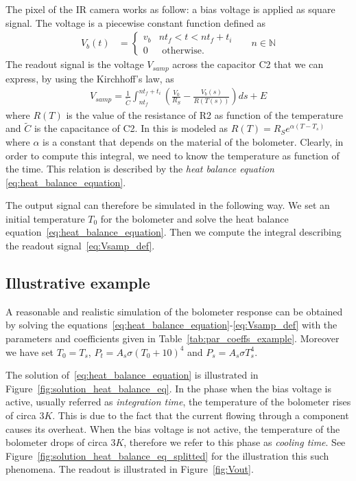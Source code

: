 The pixel of the IR camera works as follow: a bias voltage is applied as square signal. The voltage is a piecewise constant function defined as
\begin{align} \label{eq:Vb}
 V_b(t)&=\begin{cases} v_b & n t_f < t < n t_f + t_i \\
 0 &\mbox{ otherwise.}
 \end{cases} && n \in {\mathbb N}
\end{align}
The readout signal is the voltage $V_{samp}$ across the capacitor C2 that we can express, by using the Kirchhoff's law, as
\begin{align} \label{eq:Vsamp_def}
 V_{samp} =
 \frac{1}{\tilde C} \int_{n t_f}^{n t_f + t_i} \left( \frac{V_0}{R_S} - \frac{V_b(s)}{R(T(s))} \right) ds + E
\end{align}
where $R(T)$ is the value of the resistance of R2 as function of the temperature and $\tilde C$ is the capacitance of C2. In \cite{xiu2010research} this is modeled as $R(T)=R_S e^{\alpha(T-T_s)}$ where $\alpha$ is a constant that depends on the material of the bolometer. Clearly, in order to compute this integral, we need to know the temperature as function of the time. This relation is described  by the  \emph{heat balance equation} \eqref{eq:heat_balance_equation}.

The output signal can therefore be simulated in the following way. We set an initial temperature $T_0$ for the bolometer and solve the heat balance equation~\eqref{eq:heat_balance_equation}. Then we compute the integral describing the readout signal~\eqref{eq:Vsamp_def}.


\subsection{Illustrative example} \label{sec:example}
A reasonable and realistic simulation of the bolometer response can be obtained by solving the equations~\eqref{eq:heat_balance_equation}-\eqref{eq:Vsamp_def} with the parameters and coefficients given in Table~\ref{tab:par_coeffs_example}. Moreover we have set $T_0=T_s$, $P_t=A_s \sigma (T_0+10)^4$ and $P_s=A_s \sigma T_s^4$.


The solution of~\eqref{eq:heat_balance_equation} is illustrated in Figure~\ref{fig:solution_heat_balance_eq}. In the phase when the bias voltage is active, usually referred as \emph{integration time}, the temperature of the bolometer rises of circa $3K$. This is due to the fact that the current flowing through a component causes its overheat. When the bias voltage is not active, the temperature of the bolometer drops of circa $3K$, therefore we refer to this phase as \emph{cooling time}. See Figure~\ref{fig:solution_heat_balance_eq_splitted} for the illustration this such phenomena. The readout is illustrated in Figure~\ref{fig:Vout}.

